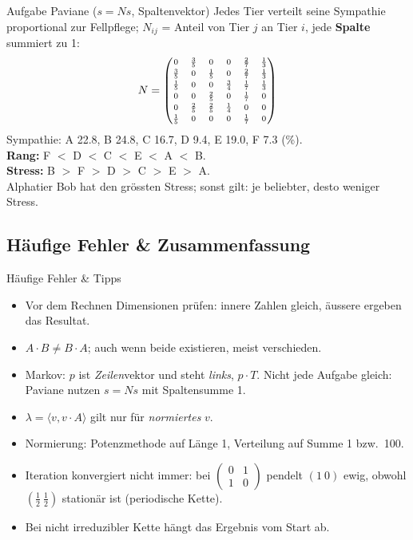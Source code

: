 \documentclass[a4paper, fontsize=7pt]{scrartcl}
\renewcommand*{\arraystretch}{1.5}  %
\begin{document}
\begin{subbox}{Aufgabe Paviane ($s = N s$, Spaltenvektor)}
\renewcommand*{\arraystretch}{1.05}
\setlength{\arraycolsep}{2.5pt}
Jedes Tier verteilt seine Sympathie proportional zur Fellpflege; $N_{ij}$ = Anteil
von Tier $j$ an Tier $i$, jede \textbf{Spalte} summiert zu 1:
$$\scriptsize N = \begin{pmatrix}
0 & \frac{3}{5} & 0 & 0 & \frac{2}{7} & \frac{1}{3}\\[2pt]
\frac{3}{5} & 0 & \frac{1}{5} & 0 & \frac{2}{7} & \frac{1}{3}\\[2pt]
\frac{1}{5} & 0 & 0 & \frac{3}{4} & \frac{1}{7} & \frac{1}{3}\\[2pt]
0 & 0 & \frac{2}{5} & 0 & \frac{1}{7} & 0\\[2pt]
0 & \frac{2}{5} & \frac{2}{5} & \frac{1}{4} & 0 & 0\\[2pt]
\frac{1}{5} & 0 & 0 & 0 & \frac{1}{7} & 0
\end{pmatrix}$$
Sympathie: A 22.8, B 24.8, C 16.7, D 9.4, E 19.0, F 7.3 (\%).\\
\textbf{Rang:} F $<$ D $<$ C $<$ E $<$ A $<$ B.\\
\textbf{Stress:} B $>$ F $>$ D $>$ C $>$ E $>$ A.\\
Alphatier Bob hat den grössten Stress; sonst gilt: je beliebter, desto weniger
Stress.
\end{subbox}

\subsection{Häufige Fehler \& Zusammenfassung}

\begin{subbox}{Häufige Fehler \& Tipps}
\begin{itemize}
    \item Vor dem Rechnen Dimensionen prüfen: innere Zahlen gleich, äussere
          ergeben das Resultat.
    \item $A \cdot B \neq B \cdot A$; auch wenn beide existieren, meist verschieden.
    \item Markov: $p$ ist \emph{Zeilen}vektor und steht \emph{links}, $p \cdot T$.
          Nicht jede Aufgabe gleich: Paviane nutzen $s = N s$ mit
          Spaltensumme 1.
    \item $\lambda = \langle v, v \cdot A \rangle$ gilt nur für
          \emph{normiertes} $v$.
    \item Normierung: Potenzmethode auf Länge 1, Verteilung auf Summe 1 bzw.\ 100.
    \item Iteration konvergiert nicht immer: bei
          $\left(\begin{smallmatrix} 0 & 1\\ 1 & 0 \end{smallmatrix}\right)$
          pendelt $(1\ 0)$ ewig, obwohl $(\frac{1}{2}\ \frac{1}{2})$ stationär
          ist (periodische Kette).
    \item Bei nicht irreduzibler Kette hängt das Ergebnis vom Start ab.
\end{itemize}
\end{subbox}
\end{document}

